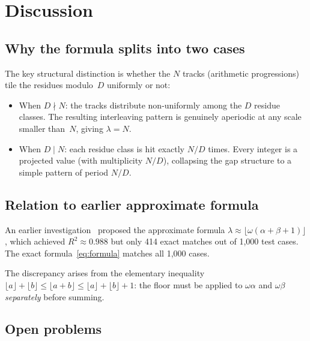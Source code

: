 \documentclass[11pt]{article}
\theoremstyle{plain}
\theoremstyle{definition}
\theoremstyle{remark}
\begin{document}
\section{Discussion}\label{sec:discussion}

\subsection{Why the formula splits into two cases}

The key structural distinction is whether the $N$ tracks (arithmetic
progressions) tile the residues modulo~$D$ uniformly or not:
\begin{itemize}
    \item When $D \nmid N$: the tracks distribute non-uniformly among the
          $D$ residue classes.  The resulting interleaving pattern is
          genuinely aperiodic at any scale smaller than~$N$, giving
          $\lambda = N$.
    \item When $D \mid N$: each residue class is hit exactly $N/D$ times.
          Every integer is a projected value (with multiplicity $N/D$),
          collapsing the gap structure to a simple pattern of period $N/D$.
\end{itemize}

\subsection{Relation to earlier approximate formula}

An earlier investigation~\cite{Kunert2025} proposed the approximate formula
$\lambda \approx \lfloor\omega(\alpha+\beta+1)\rfloor$, which achieved
$R^2 \approx 0.988$ but only 414 exact matches out of 1{,}000 test cases.
The exact formula~\eqref{eq:formula} matches all 1{,}000 cases.

The discrepancy arises from the elementary inequality
$\lfloor a \rfloor + \lfloor b \rfloor \le \lfloor a+b \rfloor
\le \lfloor a \rfloor + \lfloor b \rfloor + 1$:
the floor must be applied to $\omega\alpha$ and $\omega\beta$
\emph{separately} before summing.

\subsection{Open problems}
\end{document}
